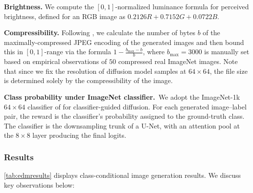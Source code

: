 \documentclass{article}
\begin{document}

\textbf{Brightness.} We compute the $[0,1]$-normalized luminance formula for perceived brightness, defined for an RGB image as $0.2126R + 0.7152G + 0.0722B$.

\textbf{Compressibility.} Following \citet{black2024trainingdiffusionmodelsreinforcement}, we calculate the number of bytes $b$ of the maximally-compressed JPEG encoding of the generated images and then bound this in $[0,1]$-range via the formula $1 - \frac{b_{\textrm{max}}-b}{b}$, where $b_{\textrm{max}}=3000$ is manually set based on empirical observations of $50$ compressed real ImageNet images. Note that since we fix the resolution of diffusion model samples at $64\times 64$, the file size is determined
solely by the compressibility of the image.

\textbf{Class probability under ImageNet classifier.}~We adopt the ImageNet-1k \(64\times64\) classifier of \citet{dhariwal2021diffusionmodelsbeatgans} for classifier-guided diffusion. For each generated image–label pair, the reward is the classifier’s probability assigned to the ground-truth class. The classifier is the downsampling trunk of a U-Net, with an attention pool at the \(8\times8\) layer producing the final logits.
\subsubsection{Results}
\label{sec:results}

\autoref{tab:edmresults} displays class-conditional image generation results. We discuss key observations below:
\end{document}
